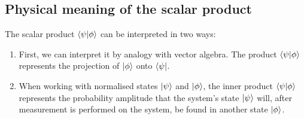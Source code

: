 \subsection{Physical meaning of the scalar product}

The scalar product $\langle\psi|\phi\rangle$ can be interpreted in two ways:
\begin{enumerate}
    \item First, we can interpret it by analogy with vector algebra. The product $\langle\psi|\phi\rangle$ represents the projection of $|\phi\rangle$ onto $\langle\psi|$.
    \item When working with normalised states $|\psi\rangle$ and $|\phi\rangle$, the inner product $\langle\psi|\phi\rangle$ represents the probability amplitude that the system's state $|\psi\rangle$ will, after measurement is performed on the system, be found in another state $|\phi\rangle$.
\end{enumerate}